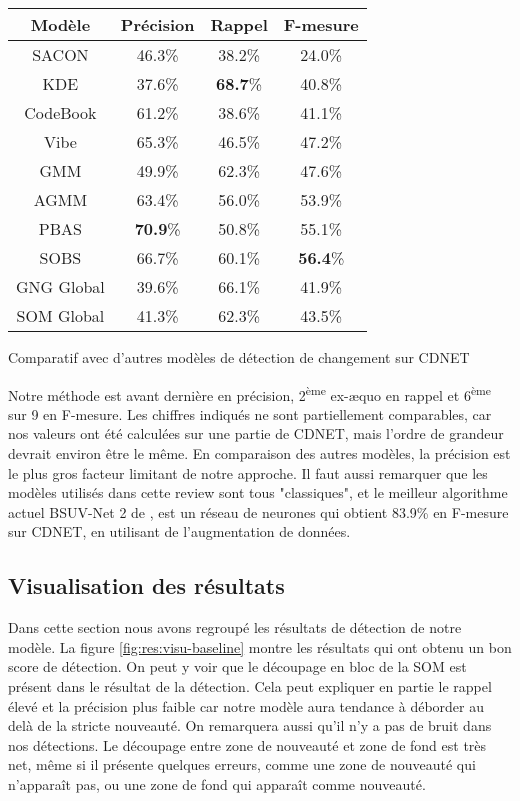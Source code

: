 	\begin{tableth}
    \begin{tabular}{|c|ccc|}
		\hline
		Modèle & Précision & Rappel & F-mesure\\
		\hline
		SACON & 46.3\% & 38.2\% & 24.0\%\\
		KDE & 37.6\% & \textbf{68.7}\% & 40.8\%\\
		CodeBook & 61.2\% & 38.6\% & 41.1\% \\
		Vibe & 65.3\% & 46.5\% & 47.2\% \\
		GMM & 49.9\% & 62.3\% & 47.6\% \\
		AGMM & 63.4\% & 56.0\% & 53.9\% \\
		PBAS & \textbf{70.9}\% & 50.8\% & 55.1\% \\
		SOBS & 66.7\% & 60.1\% & \textbf{56.4}\% \\
		\hline
		GNG Global & 39.6\% & 66.1\% & 41.9\% \\
		SOM Global & 41.3\% & 62.3\% & 43.5\% \\
		\hline
	\end{tabular}
	\caption{Comparatif avec d'autres modèles de détection de changement sur CDNET}
	\label{tab:res:compare}
	\end{tableth}

	Notre méthode est avant dernière en précision, 2\textsuperscript{ème} ex-æquo en rappel et 6\textsuperscript{ème} sur 9 en F-mesure. Les chiffres indiqués ne sont partiellement comparables, car nos valeurs ont été calculées sur une partie de CDNET, mais l'ordre de grandeur devrait environ être le même. En comparaison des autres modèles, la précision est le plus gros facteur limitant de notre approche. Il faut aussi remarquer que les modèles utilisés dans cette review sont tous "classiques", et le meilleur algorithme actuel BSUV-Net 2 de \cite{tezcan2021bsuv}, est un réseau de neurones qui obtient 83.9\% en F-mesure sur CDNET, en utilisant de l'augmentation de données.

	\subsection{Visualisation des résultats}
	
	Dans cette section nous avons regroupé les résultats de détection de notre modèle. La figure \ref{fig:res:visu-baseline} montre les résultats qui ont obtenu un bon score de détection. On peut y voir que le découpage en bloc de la SOM est présent dans le résultat de la détection. Cela peut expliquer en partie le rappel élevé et la précision plus faible car notre modèle aura tendance à déborder au delà de la stricte nouveauté. On remarquera aussi qu'il n'y a pas de bruit dans nos détections. Le découpage entre zone de nouveauté et zone de fond est très net, même si il présente quelques erreurs, comme une zone de nouveauté qui n'apparaît pas, ou une zone de fond qui apparaît comme nouveauté.

